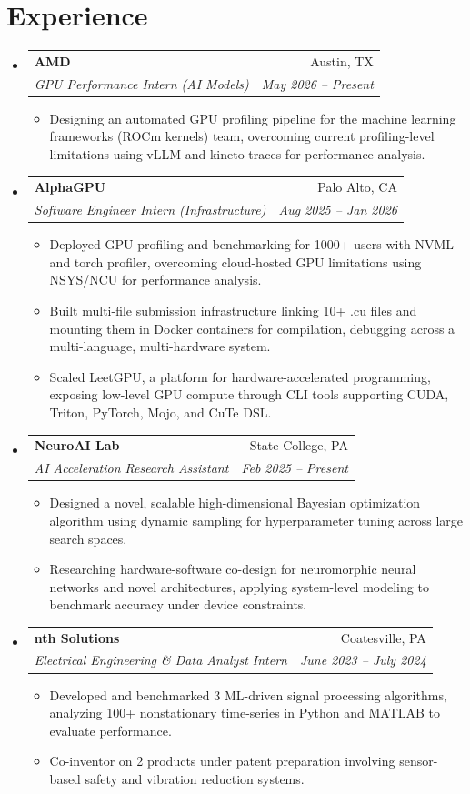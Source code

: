 \documentclass[letterpaper,11pt]{article}
\makeatletter
\newcommand{\resumeItem}[1]{
  \item\small{{#1 \vspace{-2pt}}}
}
\newcommand{\resumeSubheading}[4]{
  \vspace{-2pt}\item
    \begin{tabular*}{0.97\textwidth}[t]{l@{\extracolsep{\fill}}r}
      \textbf{#1} & #2 \\
      \textit{\small#3} & \textit{\small #4} \\
    \end{tabular*}\vspace{-7pt}
}
\newcommand{\resumeSubHeadingListStart}{\begin{itemize}[leftmargin=0.15in, label={}]}
\newcommand{\resumeSubHeadingListEnd}{\end{itemize}}
\newcommand{\resumeItemListStart}{\begin{itemize}}
\newcommand{\resumeItemListEnd}{\end{itemize}\vspace{-5pt}}
\makeatother
\begin{document}
\section{Experience}
  \resumeSubHeadingListStart
    \resumeSubheading
      {AMD}{Austin, TX}
      {GPU Performance Intern (AI Models)}{May 2026 – Present}
      \resumeItemListStart
        \resumeItem{Designing an automated GPU profiling pipeline for the machine learning frameworks (ROCm kernels) team, overcoming current profiling-level limitations using vLLM and kineto traces for performance analysis.}
      \resumeItemListEnd
    \resumeSubheading
      {AlphaGPU}{Palo Alto, CA}
      {Software Engineer Intern (Infrastructure)}{Aug 2025 – Jan 2026}
      \resumeItemListStart
        \resumeItem{Deployed GPU profiling and benchmarking for 1000+ users with NVML and torch profiler, overcoming cloud-hosted GPU limitations using NSYS/NCU for performance analysis.}
        \resumeItem{Built multi-file submission infrastructure linking 10+ .cu files and mounting them in Docker containers for compilation, debugging across a multi-language, multi-hardware system.}
        \resumeItem{Scaled LeetGPU, a platform for hardware-accelerated programming, exposing low-level GPU compute through CLI tools supporting CUDA, Triton, PyTorch, Mojo, and CuTe DSL.}
      \resumeItemListEnd
    \resumeSubheading
      {NeuroAI Lab}{State College, PA}
      {AI Acceleration Research Assistant}{Feb 2025 – Present}
      \resumeItemListStart
        \resumeItem{Designed a novel, scalable high-dimensional Bayesian optimization algorithm using dynamic sampling for hyperparameter tuning across large search spaces.}
        \resumeItem{Researching hardware-software co-design for neuromorphic neural networks and novel architectures, applying system-level modeling to benchmark accuracy under device constraints.}
      \resumeItemListEnd
    \resumeSubheading
      {nth Solutions}{Coatesville, PA}
      {Electrical Engineering \& Data Analyst Intern}{June 2023 – July 2024}
      \resumeItemListStart
        \resumeItem{Developed and benchmarked 3 ML-driven signal processing algorithms, analyzing 100+ nonstationary time-series in Python and MATLAB to evaluate performance.}
        \resumeItem{Co-inventor on 2 products under patent preparation involving sensor-based safety and vibration reduction systems.}
      \resumeItemListEnd
  \resumeSubHeadingListEnd

\end{document}
